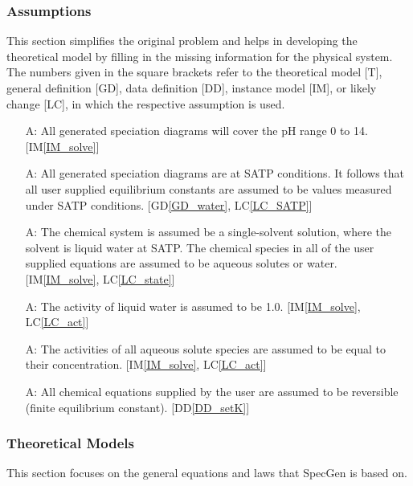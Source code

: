 \documentclass[12pt]{article}
\newcommand{\dref}[1]{GD\ref{#1}}
\newcommand{\ddref}[1]{DD\ref{#1}}
\newcounter{assumpnum} %
\newcommand{\iref}[1]{IM\ref{#1}}
\newcommand{\lcref}[1]{LC\ref{#1}}
\newcommand{\progname}{SpecGen} %
\begin{document}
\subsubsection{Assumptions}

This section simplifies the original problem and helps in developing the
theoretical model by filling in the missing information for the physical
system. The numbers given in the square brackets refer to the theoretical model
[T], general definition [GD], data definition [DD], instance model [IM], or
likely change [LC], in which the respective assumption is used.

\begin{itemize}
\item[A\refstepcounter{assumpnum}\theassumpnum \label{A_pH}:]
  All generated speciation diagrams will cover the pH range 0 to 14. 
  [\iref{IM_solve}]
\item[A\refstepcounter{assumpnum}\theassumpnum \label{A_SATP}:]
  All generated speciation diagrams are at SATP conditions.  It follows that 
  all user supplied equilibrium constants are assumed to be values measured 
  under SATP conditions. [\dref{GD_water}, \lcref{LC_SATP}]
\item[A\refstepcounter{assumpnum}\theassumpnum \label{A_only_aq}:]
  The chemical system is assumed be a single-solvent solution, where the solvent 
  is liquid water at SATP.  The chemical species in all of the user supplied 
  equations are assumed to be aqueous solutes or water. [\iref{IM_solve}, 
  \lcref{LC_state}]
\item[A\refstepcounter{assumpnum}\theassumpnum \label{A_act_wat}:]
  The activity of liquid water is assumed to be 1.0. [\iref{IM_solve}, 
  \lcref{LC_act}]
\item[A\refstepcounter{assumpnum}\theassumpnum \label{A_act_aq}:]
  The activities of all aqueous solute species are assumed to be equal to 
  their concentration. [\iref{IM_solve}, \lcref{LC_act}]
\item[A\refstepcounter{assumpnum}\theassumpnum \label{A_rev}:]
  All chemical equations supplied by the user are assumed to be reversible 
  (finite equilibrium constant). [\ddref{DD_setK}]
\end{itemize}

\subsubsection{Theoretical Models}\label{sec_theoretical}

This section focuses on the general equations and laws that \progname{} is based
on.
\end{document}
